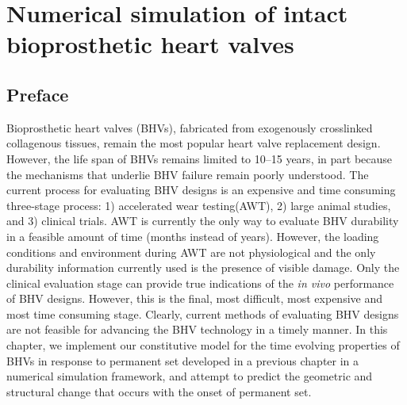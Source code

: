 \chapter{Numerical simulation of intact bioprosthetic heart valves}

\section*{Preface}
%

    Bioprosthetic heart valves (BHVs), fabricated from exogenously crosslinked collagenous tissues, remain the most popular heart valve replacement design. However, the life span of BHVs remains limited to 10–15 years, in part because the mechanisms that underlie BHV failure remain poorly understood. The current process for evaluating BHV designs is an expensive and time consuming three-stage process: 1) accelerated wear testing(AWT), 2) large animal studies, and 3) clinical trials. AWT is currently the only way to evaluate BHV durability in a feasible amount of time (months instead of years). However, the loading conditions and environment during AWT are not physiological and the only durability information currently used is the presence of visible damage. Only the clinical evaluation stage can provide true indications of the \textit{in vivo} performance of BHV designs. However, this is the final, most difficult, most expensive and most time consuming stage. Clearly, current methods of evaluating BHV designs are not feasible for advancing the BHV technology in a timely manner. In this chapter, we implement our constitutive model for the time evolving properties of BHVs in response to permanent set developed in a previous chapter in a numerical simulation framework, and attempt to predict the geometric and structural change that occurs with the onset of permanent set. 
















